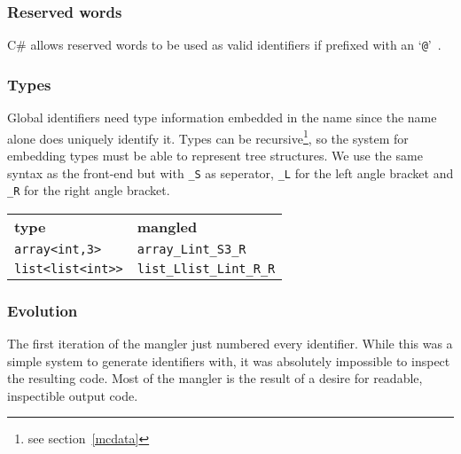 \subsubsection{Reserved words}
C\# allows reserved words to be used as valid identifiers if prefixed with an `\verb|@|'~\cite{msdn_identifiers}.

\subsubsection{Types}
Global identifiers need type information embedded in the name since the name alone does uniquely identify it.
Types can be recursive\footnote{see section~\ref{mcdata}}, so the system for embedding types must be able to represent tree structures.
We use the same syntax as the front-end but with \verb|_S| as seperator, \verb|_L| for the left angle bracket and \verb|_R| for the right angle bracket.

{\footnotesize
\begin{tabular}{ll}
\textbf{\normalsize type}          & \textbf{\normalsize mangled} \\
\verb|array<int,3>|    & \verb|array_Lint_S3_R| \\
\verb|list<list<int>>| & \verb|list_Llist_Lint_R_R| \\
\end{tabular}
}

\subsubsection{Evolution}
The first iteration of the mangler just numbered every identifier.
While this was a simple system to generate identifiers with, it was absolutely impossible to inspect the resulting code.
Most of the mangler is the result of a desire for readable, inspectible output code.

